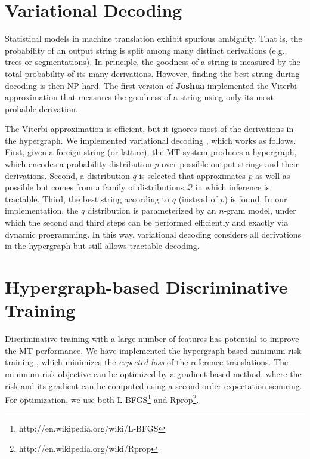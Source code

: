 \documentclass[11pt]{article}
\newcommand{\joshua}{\textbf{Joshua}\xspace}
\begin{document}
\section{Variational Decoding}

Statistical models in machine translation exhibit spurious ambiguity.
That is, the probability of an output string is split
among many distinct derivations (e.g., trees or
segmentations). In principle, the goodness of a
string is measured by the total probability of its
many derivations. However, finding the best string
during decoding is then NP-hard.
The first version of \joshua implemented the
Viterbi approximation that measures the goodness 
of a string using only its most probable derivation.

The Viterbi approximation is efficient, but it ignores most of the derivations in the hypergraph.
We implemented variational decoding \cite{variational-decoding-acl09}, which works as follows.
First, given a foreign string (or lattice), the MT system produces a hypergraph, 
which encodes a probability distribution $p$ over 
possible output strings and their derivations.
Second, a distribution $q$ is selected that approximates $p$ as well as possible but comes from a family of distributions $\mathcal{Q}$ in which inference is tractable.  Third, the best string according to $q$ (instead of $p$) is found.
In our implementation, the $q$ distribution is parameterized by an $n$-gram model, under which 
the second and third steps can be performed efficiently and exactly via dynamic programming.
In this way, variational decoding considers all derivations in the hypergraph but still
allows tractable decoding. 



\section{Hypergraph-based Discriminative Training}

Discriminative training with a large number of features has 
potential to improve the MT performance.
We have implemented the hypergraph-based minimum risk training \cite{li-eisner:2009:EMNLP},
which minimizes the {\em expected loss} of the reference translations.
The minimum-risk objective can be optimized by a gradient-based method, where
the risk and its gradient can be computed using a second-order expectation semiring.
For optimization, we use both L-BFGS\footnote{http://en.wikipedia.org/wiki/L-BFGS} 
and Rprop\footnote{http://en.wikipedia.org/wiki/Rprop}.
\end{document}
